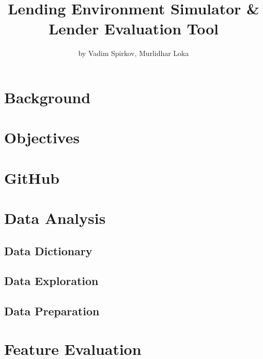 \title{Lending Environment Simulator \& Lender Evaluation Tool}
\author{by Vadim Spirkov, Murlidhar Loka}

\maketitle



\hypertarget{background}{%
\section{Background}\label{background}}

\hypertarget{objectives}{%
\section{Objectives}\label{objectives}}

\hypertarget{github}{%
\section{GitHub}\label{github}}

\hypertarget{data-analysis}{%
\section{Data Analysis}\label{data-analysis}}

\hypertarget{data-dictionary}{%
\subsection{Data Dictionary}\label{data-dictionary}}

\hypertarget{data-exploration}{%
\subsection{Data Exploration}\label{data-exploration}}

\hypertarget{data-preparation}{%
\subsection{Data Preparation}\label{data-preparation}}

\hypertarget{feature-evaluation}{%
\section{Feature Evaluation}\label{feature-evaluation}}

